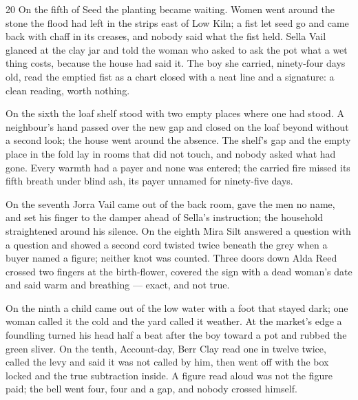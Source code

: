 






\CRtailpiece
\begin{CRchronicle}{20}
On the fifth of Seed the planting became waiting. Women went around the stone the flood had left in the strips east of Low Kiln; a fist let seed go and came back with chaff in its creases, and nobody said what the fist held. Sella Vail glanced at the clay jar and told the woman who asked to ask the pot what a wet thing costs, because the house had said it. The boy she carried, ninety-four days old, read the emptied fist as a chart closed with a neat line and a signature: a clean reading, worth nothing.

On the sixth the loaf shelf stood with two empty places where one had stood. A neighbour’s hand passed over the new gap and closed on the loaf beyond without a second look; the house went around the absence. The shelf’s gap and the empty place in the fold lay in rooms that did not touch, and nobody asked what had gone. Every warmth had a payer and none was entered; the carried fire missed its fifth breath under blind ash, its payer unnamed for ninety-five days.

On the seventh Jorra Vail came out of the back room, gave the men no name, and set his finger to the damper ahead of Sella’s instruction; the household straightened around his silence. On the eighth Mira Silt answered a question with a question and showed a second cord twisted twice beneath the grey when a buyer named a figure; neither knot was counted. Three doors down Alda Reed crossed two fingers at the birth-flower, covered the sign with a dead woman’s date and said warm and breathing --- exact, and not true.

On the ninth a child came out of the low water with a foot that stayed dark; one woman called it the cold and the yard called it weather. At the market’s edge a foundling turned his head half a beat after the boy toward a pot and rubbed the green sliver. On the tenth, Account-day, Berr Clay read one in twelve twice, called the levy and said it was not called by him, then went off with the box locked and the true subtraction inside. A figure read aloud was not the figure paid; the bell went four, four and a gap, and nobody crossed himself.


\end{CRchronicle}
